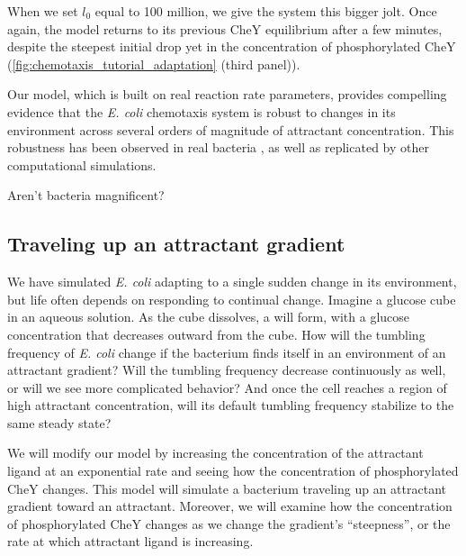 When we set $l_0$ equal to 100 million, we give the system this bigger jolt. Once again, the model returns to its previous CheY equilibrium after a few minutes, despite the steepest initial drop yet in the concentration of phosphorylated CheY (\autoref{fig:chemotaxis_tutorial_adaptation} (third panel)).

Our model, which is built on real reaction rate parameters, provides compelling evidence that the \textit{E. coli} chemotaxis system is robust to changes in its environment across several orders of magnitude of attractant concentration. This robustness has been observed in real bacteria , as well as replicated by other computational simulations.

Aren't bacteria magnificent?

\FloatBarrier
{}

\subsection{Traveling up an attractant gradient}

We have simulated \textit{E. coli} adapting to a single sudden change in its environment, but life often depends on responding to continual change. Imagine a glucose cube in an aqueous solution. As the cube dissolves, a  will form, with a glucose concentration that decreases outward from the cube. How will the tumbling frequency of \textit{E. coli} change if the bacterium finds itself in an environment of an attractant gradient?  Will the tumbling frequency decrease continuously as well, or will we see more complicated behavior? And once the cell reaches a region of high attractant concentration, will its default tumbling frequency stabilize to the same steady state?

We will modify our model by increasing the concentration of the attractant ligand at an exponential rate and seeing how the concentration of phosphorylated CheY changes. This model will simulate a bacterium traveling up an attractant gradient toward an attractant. Moreover, we will examine how the concentration of phosphorylated CheY changes as we change the gradient's ``steepness'', or the rate at which attractant ligand is increasing.


